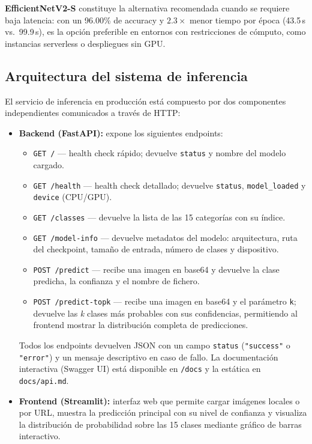 \documentclass[11pt,a4paper]{article}
\begin{document}
\textbf{EfficientNetV2-S} constituye la alternativa recomendada cuando se requiere baja latencia: con un 96.00\% de accuracy y $2.3\times$ menor tiempo por época (43.5\,s vs.\ 99.9\,s), es la opción preferible en entornos con restricciones de cómputo, como instancias serverless o despliegues sin GPU.

\subsection{Arquitectura del sistema de inferencia}

El servicio de inferencia en producción está compuesto por dos componentes independientes comunicados a través de HTTP:

\begin{itemize}\setlength\itemsep{3pt}
    \item \textbf{Backend (FastAPI):} expone los siguientes endpoints:
    \begin{itemize}\setlength\itemsep{2pt}
        \item \texttt{GET /} — health check rápido; devuelve \texttt{status} y nombre del modelo cargado.
        \item \texttt{GET /health} — health check detallado; devuelve \texttt{status}, \texttt{model\_loaded} y \texttt{device} (CPU/GPU).
        \item \texttt{GET /classes} — devuelve la lista de las 15 categorías con su índice.
        \item \texttt{GET /model-info} — devuelve metadatos del modelo: arquitectura, ruta del checkpoint, tamaño de entrada, número de clases y dispositivo.
        \item \texttt{POST /predict} — recibe una imagen en base64 y devuelve la clase predicha, la confianza y el nombre de fichero.
        \item \texttt{POST /predict-topk} — recibe una imagen en base64 y el parámetro \texttt{k}; devuelve las \textit{k} clases más probables con sus confidencias, permitiendo al frontend mostrar la distribución completa de predicciones.
    \end{itemize}
    Todos los endpoints devuelven JSON con un campo \texttt{status} (\texttt{"success"} o \texttt{"error"}) y un mensaje descriptivo en caso de fallo. La documentación interactiva (Swagger UI) está disponible en \texttt{/docs} y la estática en \texttt{docs/api.md}.
    \item \textbf{Frontend (Streamlit):} interfaz web que permite cargar imágenes locales o por URL, muestra la predicción principal con su nivel de confianza y visualiza la distribución de probabilidad sobre las 15 clases mediante gráfico de barras interactivo.
\end{itemize}
\end{document}
